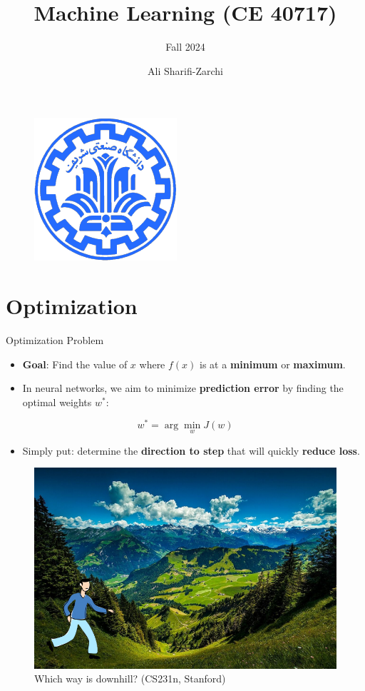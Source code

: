 \documentclass[serif, aspectratio=169]{beamer}
\author{Ali Sharifi-Zarchi}
\title{Machine Learning (CE 40717)}
\subtitle{Fall 2024}
\institute{
    CE Department \\
    Sharif University of Technology
}
\begin{document}
\begin{frame}
    \titlepage
    \vspace*{-0.6cm}
    \begin{figure}[htpb]
        \begin{center}
            \includegraphics[keepaspectratio, scale=0.25]{pic/sharif-main-logo.png}
        \end{center}
    \end{figure}
\end{frame}

\begin{frame}    
\tableofcontents[sectionstyle=show,
subsectionstyle=show/shaded/hide,
subsubsectionstyle=show/shaded/hide]
\end{frame}

\section{Optimization}

\begin{frame}{Optimization Problem}
    \begin{itemize}
        \item \textbf{Goal}: Find the value of $x$ where $f(x)$ is at a \textbf{minimum} or \textbf{maximum}.
        \item In neural networks, we aim to minimize \textbf{prediction error} by finding the optimal weights $w^*$:
    \end{itemize}
    
    \[
    w^* = \arg\min_{w} J(w)
    \]
    
    \begin{itemize}
        \item Simply put: determine the \textbf{direction to step} that will quickly \textbf{reduce loss}.
    \end{itemize}
    
    \begin{figure}[h]
        \centering
        \includegraphics[width=0.3\linewidth]{pic/downhill_feifei_rouhan.png}
        \caption{Which way is downhill? (CS231n, Stanford)}
    \end{figure}
\end{frame}
\end{document}

